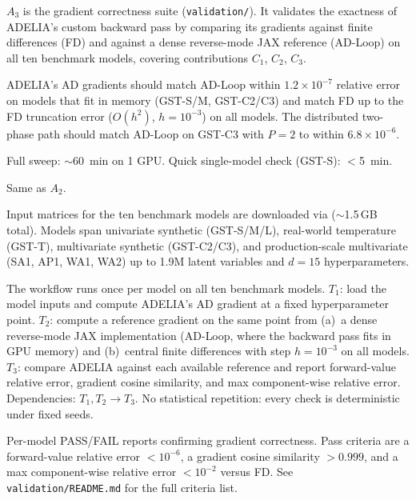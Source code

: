 \documentclass[nonacm,sigconf]{acmart}
\begin{document}
$A_3$ is the gradient correctness suite (\texttt{validation/}). It
validates the exactness of ADELIA's custom backward pass by
comparing its gradients against finite differences (FD) and
against a dense reverse-mode JAX reference (AD-Loop) on all ten
benchmark models, covering contributions $C_1$, $C_2$, $C_3$.

\artexp

ADELIA's AD gradients should match AD-Loop within
$1.2 \times 10^{-7}$ relative error on models that fit in memory
(GST-S/M, GST-C2/C3) and match FD up to the FD truncation error
($O(h^2)$, $h{=}10^{-3}$) on all models. The distributed two-phase
path should match AD-Loop on GST-C3 with $P{=}2$ to within
$6.8 \times 10^{-6}$.

\arttime

Full sweep: $\sim$60~min on 1 GPU.
Quick single-model check (GST-S): $<$5~min.

\artin


Same as $A_2$.


Input matrices for the ten benchmark models are downloaded via
 ($\sim$1.5\,GB total). Models
span univariate synthetic (GST-S/M/L), real-world temperature
(GST-T), multivariate synthetic (GST-C2/C3), and production-scale
multivariate (SA1, AP1, WA1, WA2) up to 1.9M latent variables
and $d{=}15$ hyperparameters.

\artcomp

The workflow runs once per model on all ten benchmark models.
$T_1$: load the model inputs and compute ADELIA's AD gradient
at a fixed hyperparameter point.
$T_2$: compute a reference gradient on the same point from
(a)~a dense reverse-mode JAX implementation (AD-Loop, where the
backward pass fits in GPU memory) and (b)~central finite
differences with step $h{=}10^{-3}$ on all models.
$T_3$: compare ADELIA against each available reference and
report forward-value relative error, gradient cosine similarity,
and max component-wise relative error.
Dependencies: $T_1, T_2 \rightarrow T_3$. No statistical
repetition: every check is deterministic under fixed seeds.

\artout

Per-model PASS/FAIL reports confirming gradient correctness.
Pass criteria are a forward-value relative error $< 10^{-6}$,
a gradient cosine similarity $> 0.999$, and a max
component-wise relative error $< 10^{-2}$ versus FD.
See \texttt{validation/README.md} for the full criteria list.
\end{document}
